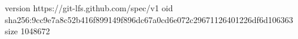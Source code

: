 version https://git-lfs.github.com/spec/v1
oid sha256:9cc9e7a8c52b416f899149f896dc67a0cd6e072c29671126401226df6d106363
size 1048672
